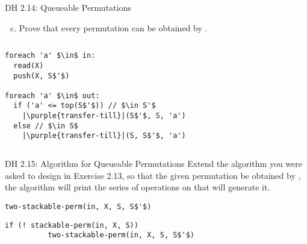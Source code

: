 \begin{frame}[fragile]{}
  \begin{exampleblock}{DH 2.14: Queueable Permutations}
    \begin{enumerate}[(a)]
      \setcounter{enumi}{2}
      \item Prove that every permutation can be obtained by .
    \end{enumerate}
  \end{exampleblock}

  \vspace{0.30cm}
  \begin{columns}
    \pause
      \begin{lstlisting}[style = Cstyle]
foreach 'a' $\in$ in:
  read(X)
  push(X, S$'$)

foreach 'a' $\in$ out:
  if ('a' <= top(S$'$)) // $\in S'$
    |\purple{transfer-till}|(S$'$, S, 'a')
  else // $\in S$
    |\purple{transfer-till}|(S, S$'$, 'a')
      \end{lstlisting}
  \end{columns}
\end{frame}

\begin{frame}[fragile]{}
  \begin{exampleblock}{DH 2.15: Algorithm for Queueable Permutations}
    Extend the algorithm you were asked to design in Exercise 2.13,
    so that  the given permutation  be obtained by ,
    the algorithm will print the series of operations on  that will generate it.
  \end{exampleblock}

  \pause

  \pause
  \vspace{-0.20cm}
  \begin{lstlisting}[style = Cstyle]
        two-stackable-perm(in, X, S, S$'$)
  \end{lstlisting}

  \pause
  \begin{lstlisting}[style = Cstyle]
        if (! stackable-perm(in, X, S))
          two-stackable-perm(in, X, S, S$'$)
  \end{lstlisting}

  \pause
  \centerline{\large {}}
\end{frame}


